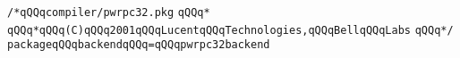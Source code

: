 \label{src/lib/core/compiler/pwrpc32.pkg}
\verb|/*qQQqcompiler/pwrpc32.pkg|\newline
\verb|qQQq*|\newline
\verb|qQQq*qQQq(C)qQQq2001qQQqLucentqQQqTechnologies,qQQqBellqQQqLabs|\newline
\verb|qQQq*/|\newline
\verb|packageqQQqbackendqQQq=qQQqpwrpc32backend|\newline

